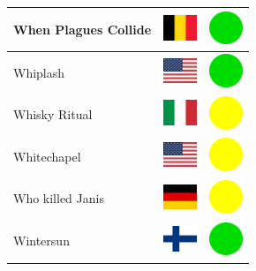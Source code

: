\documentclass[12pt, a4paper, twoside]{report}
\begin{document}
\begin{center}
\begin{longtable}{|p{5cm}|p{2cm}|p{2cm}|}
 When Plagues Collide                                       & \includegraphics[width=1cm]{../4x3/be} &   \includegraphics[width=1cm]{../likes/y} \\ \hline
 Whiplash                                                   & \includegraphics[width=1cm]{../4x3/us} &   \includegraphics[width=1cm]{../likes/y} \\ \hline
 Whisky Ritual                                              & \includegraphics[width=1cm]{../4x3/it} &   \includegraphics[width=1cm]{../likes/m} \\ \hline
 Whitechapel                                                & \includegraphics[width=1cm]{../4x3/us} &   \includegraphics[width=1cm]{../likes/m} \\ \hline
 Who killed Janis                                           & \includegraphics[width=1cm]{../4x3/de} &   \includegraphics[width=1cm]{../likes/m} \\ \hline
 Wintersun                                                  & \includegraphics[width=1cm]{../4x3/fi} &   \includegraphics[width=1cm]{../likes/y} \\ \hline

\end{longtable}
\end{center}
\end{document}
